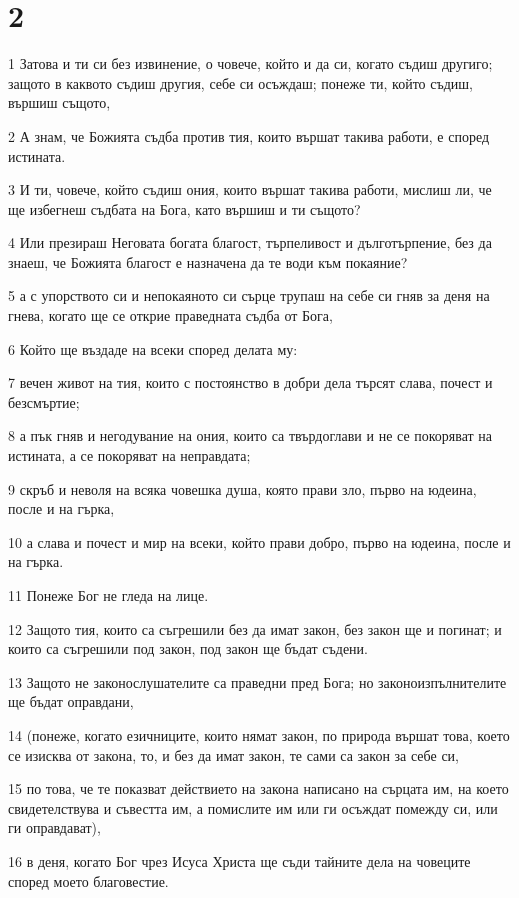 \chapter{2}

\par 1 Затова и ти си без извинение, о човече, който и да си, когато съдиш другиго; защото в каквото съдиш другия, себе си осъждаш; понеже ти, който съдиш, вършиш същото,
\par 2 А знам, че Божията съдба против тия, които вършат такива работи, е според истината.
\par 3 И ти, човече, който съдиш ония, които вършат такива работи, мислиш ли, че ще избегнеш съдбата на Бога, като вършиш и ти същото?
\par 4 Или презираш Неговата богата благост, търпеливост и дълготърпение, без да знаеш, че Божията благост е назначена да те води към покаяние?
\par 5 а с упорството си и непокаяното си сърце трупаш на себе си гняв за деня на гнева, когато ще се открие праведната съдба от Бога,
\par 6 Който ще въздаде на всеки според делата му:
\par 7 вечен живот на тия, които с постоянство в добри дела търсят слава, почест и безсмъртие;
\par 8 а пък гняв и негодувание на ония, които са твърдоглави и не се покоряват на истината, а се покоряват на неправдата;
\par 9 скръб и неволя на всяка човешка душа, която прави зло, първо на юдеина, после и на гърка,
\par 10 а слава и почест и мир на всеки, който прави добро, първо на юдеина, после и на гърка.
\par 11 Понеже Бог не гледа на лице.
\par 12 Защото тия, които са съгрешили без да имат закон, без закон ще и погинат; и които са съгрешили под закон, под закон ще бъдат съдени.
\par 13 Защото не законослушателите са праведни пред Бога; но законоизпълнителите ще бъдат оправдани,
\par 14 (понеже, когато езичниците, които нямат закон, по природа вършат това, което се изисква от закона, то, и без да имат закон, те сами са закон за себе си,
\par 15 по това, че те показват действието на закона написано на сърцата им, на което свидетелствува и съвестта им, а помислите им или ги осъждат помежду си, или ги оправдават),
\par 16 в деня, когато Бог чрез Исуса Христа ще съди тайните дела на човеците според моето благовестие.
